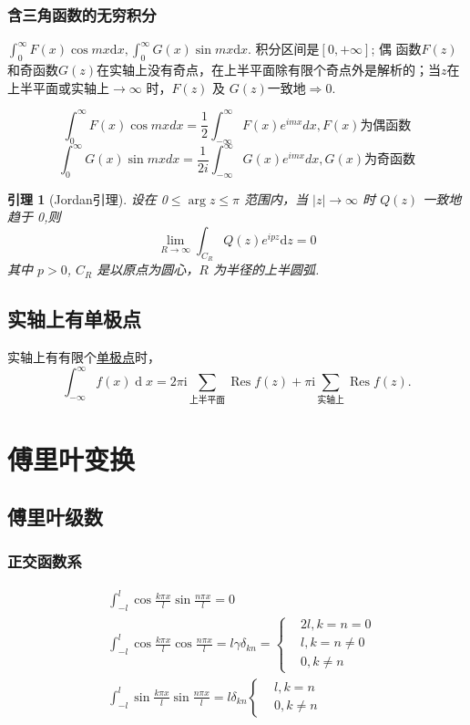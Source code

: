\documentclass[11pt, a4paper, twoside]{ctexbook}
\newtheorem{lemma}[theorem]{引理}
\begin{document}
\subsection{含三角函数的无穷积分}
$\int_{0}^{\infty}F( x) \cos mx \mathrm{d}x, \int _0^\infty G( x) \sin mx\mathrm{d}x$. 积分区间是$[0,+\infty]$; 偶
函数$F(z)$和奇函数$G(z)$在实轴上没有奇点，在上半平面除有限个奇点外是解析的；当$z$在上半平面或实轴上$\to \infty$ 时，$F(z)$ 及 $G(z)$一致地$\Rightarrow 0$.

$$\int_0^{\infty}F(x)\cos mx dx = \frac{1}{2}\int_{-\infty}^{\infty} F(x)e^{imx}dx,F(x)\text{为偶函数} $$
$$\int_0^{\infty}G(x) \sin mx dx = \frac{1}{2 i}\int_{-\infty}^{\infty} G(x)e^{imx}dx,G(x)\text{为奇函数}$$

\begin{lemma}[Jordan引理]
    设在 0$\leqslant\arg z\leqslant\pi$ 范围内，当 $|z|\to\infty$ 时 $Q(z)$ 一致地趋于 0,则
    $$\lim_{R \to \infty}\int_{C_R} Q(z)e^{ipz}\mathrm{d}z = 0$$
其中 $p>0$, $C_R$ 是以原点为圆心，$R$ 为半径的上半圆弧.
\end{lemma}
\section{实轴上有单极点}
实轴上有有限个\underline{单极点}时，
$$\int_{-\infty}^\infty f(x)\operatorname{d}x=2\pi\mathrm{i}\sum_\text{上半平面}{ \operatorname { R e s }}f(z)+\pi\mathrm{i}\sum_\text{实轴上}{ \operatorname { R e s }} f(z).$$

\renewcommand{\cleardoublepage}{}
\renewcommand{\clearpage}{}
\chapter{傅里叶变换}
\section{傅里叶级数}
\subsection{正交函数系}
$$\begin{aligned}
    &\int_{-l}^l \cos\frac{k\pi x}{l} \sin\frac{n\pi x}{l} = 0\\
    &\int_{-l}^l \cos\frac{k\pi x}{l} \cos\frac{n\pi x}{l} = l\gamma \delta_{kn} = \begin{cases}&2l, k = n = 0\\&l,k = n \ne 0\\&0, k\ne n\end{cases}\\
    &\int_{-l}^l \sin\frac{k\pi x}{l} \sin\frac{n\pi x}{l} = l\delta_{kn}\begin{cases}&l,k = n\\&0,k \ne n\end{cases}
\end{aligned}$$
\end{document}
